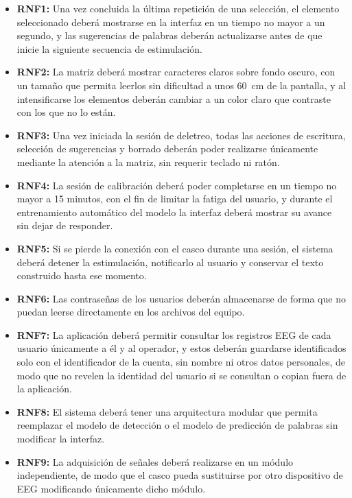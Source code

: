 \begin{itemize}
  \item \textbf{RNF1:} Una vez concluida la última repetición de una selección, el
  elemento seleccionado deberá mostrarse en la interfaz en un tiempo no mayor a un segundo, y las
  sugerencias de palabras deberán actualizarse antes de que inicie la siguiente secuencia de
  estimulación.
  \item \textbf{RNF2:} La matriz deberá mostrar caracteres claros sobre fondo oscuro, con un
  tamaño que permita leerlos sin dificultad a unos 60~cm de la pantalla, y al intensificarse los
  elementos deberán cambiar a un color claro que contraste con los que no lo están.
  \item \textbf{RNF3:} Una vez iniciada la sesión de deletreo, todas las acciones de
  escritura, selección de sugerencias y borrado deberán poder realizarse únicamente mediante la
  atención a la matriz, sin requerir teclado ni ratón.
  \item \textbf{RNF4:} La sesión de calibración deberá poder completarse en un tiempo
  no mayor a 15 minutos, con el fin de limitar la fatiga del usuario, y durante el entrenamiento
  automático del modelo la interfaz deberá mostrar su avance sin dejar de responder.
  \item \textbf{RNF5:} Si se pierde la conexión con el casco durante una sesión, el
  sistema deberá detener la estimulación, notificarlo al usuario y conservar el texto construido
  hasta ese momento.
  \item \textbf{RNF6:} Las contraseñas de los usuarios deberán almacenarse de forma que no puedan leerse directamente en los archivos del equipo.
  \item \textbf{RNF7:} La aplicación deberá permitir consultar los registros EEG de cada usuario únicamente a él y al operador, y estos deberán guardarse identificados solo con el identificador de
  la cuenta, sin nombre ni otros datos personales, de modo que no revelen la identidad del usuario
  si se consultan o copian fuera de la aplicación.
  \item \textbf{RNF8:} El sistema deberá tener una arquitectura modular que
  permita reemplazar el modelo de detección o el modelo de predicción de palabras sin modificar la
  interfaz.
  \item \textbf{RNF9:} La adquisición de señales deberá realizarse en un módulo independiente, de modo que el casco pueda sustituirse por otro dispositivo de EEG modificando únicamente dicho módulo.
\end{itemize}

